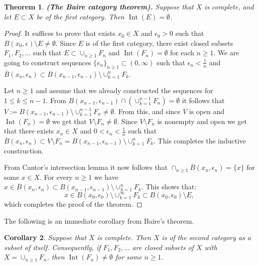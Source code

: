 \documentclass[11pt,a4paper]{article}
\theoremstyle{definition}
\theoremstyle{plain}
\newtheorem{theorem}{Theorem}[section]
\newtheorem{corollary}[theorem]{Corollary}
\DeclareMathOperator{\Int}{Int}
\renewcommand{\tt}[1]{\textnormal{\textbf{(#1).}}} %
\begin{document}
  \begin{theorem}
    \tt{The Baire category theorem}
    Suppose that $X$ is complete, and let $E \subset X$ be of the first
    category. Then $\Int(E) = \emptyset$.
  \end{theorem}
  \begin{proof}
    It suffices to prove that exists $x_0 \in X$ and $\epsilon_0 > 0$ such
    that $B(x_0,\epsilon) \setminus E \neq \emptyset$. Since $E$ is of
    the first category, there exist closed subsets $F_1,F_2,\dots$ such that
    $E \subset \cup_{n \geq 1}{F_n}$ and $\Int(F_n) = \emptyset$ for each
    $n \geq 1$. We are going to construct sequences 
    $\{e_n\}_{n \geq 1} \subset (0,\infty)$ such that 
    $\epsilon_n < \frac{1}{n}$ and $\overline{B}(x_n,\epsilon_n) \subset
    B(x_{n-1},\epsilon_{n-1}) \setminus \cup_{k=1}^{n}{F_k}$. 
    
    Let $n \geq 1$ and assume that we already constructed the sequences
    for $1 \le k \le n-1$. From 
    $B(x_{n-1},\epsilon_{n-1}) \cap (\cup_{k=1}^{n-1}{F_n}) = \emptyset$ 
    it follows that 	
    $V:=B(x_{n-1},\epsilon_{n-1}) \setminus \cup_{k=1}^{n-1}{F_n} 
    \neq \emptyset$. From this, and since $V$ is open and 
    $\Int(F_n) = \emptyset$ we get that $V \setminus F_n \neq \emptyset$.
    Since $V \setminus F_n$ is nonempty and open we get that there exists
    $x_n \in X$ and $0 < \epsilon_n < \frac{1}{n}$ such that
    $\overline{B}(x_n,\epsilon_n) \subset V \setminus F_n = 
    B(x_{n-1},\epsilon_{n-1}) \setminus \cup_{k=1}^{n}{F_k}$.
    This completes the inductive construction.
    
    From Cantor's intersection lemma it now follows that
    $\cap_{n \geq 1}{\overline{B}(x_n,\epsilon_n)} = \{x\}$ for some
    $x \in X$. For every $n \geq 1$ we have 
    $x \in \overline{B}(x_n,\epsilon_n) \subset 
    B(x_{n-1},\epsilon_{n-1}) \setminus \cup_{k=1}^{n}{F_k}$. This
    shows that:
    \[
      x \in B(x_{0},\epsilon_{0}) \setminus \cup_{k=1}^{\infty}{F_k}
      \subset B(x_0,\epsilon_0) \setminus E,
    \]
    which completes the proof of the theorem.
  \end{proof}
   
  The following is an immediate corollary from Baire's theorem.
  
  \begin{corollary}
    Suppose that $X$ is complete. Then $X$ is of the second category as a
    subset of itself. Consequently, if $F_1,F_2,\dots$ are closed subsets 
    of $X$ with $X = \cup_{n \geq 1}{F_n}$, then $\Int(F_n) \neq \emptyset$ 
    for some $n \geq 1$.
  \end{corollary}
  
\end{document}
